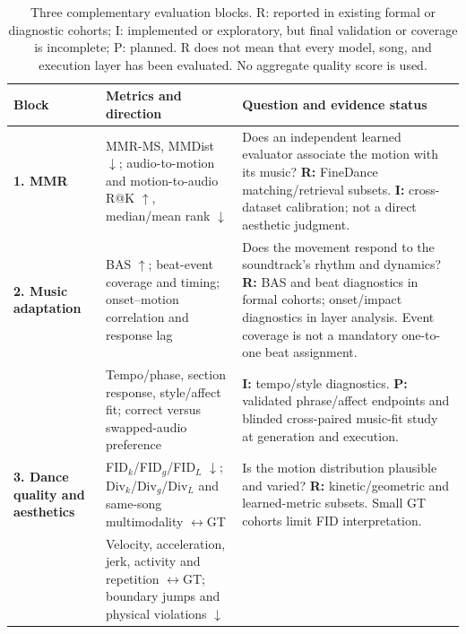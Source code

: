 \begin{table}[!t]
\centering
\caption{Three complementary evaluation blocks. R: reported in existing formal
or diagnostic cohorts; I: implemented or exploratory, but final validation or
coverage is incomplete; P: planned. R does not mean that every model, song, and
execution layer has been evaluated. No aggregate quality score is used.}
\label{tab:evaluation_matrix}
\small
\renewcommand{\arraystretch}{1.16}
\setlength{\tabcolsep}{0pt}
\begin{tabular}{@{}>{\raggedright\arraybackslash}p{}
                    @{\hspace{0.02\textwidth}}
                    >{\raggedright\arraybackslash}p{}
                    @{\hspace{0.02\textwidth}}
                    >{\raggedright\arraybackslash}p{}@{}}
\toprule
\textbf{Block} & \textbf{Metrics and direction} & \textbf{Question and evidence status} \\
\midrule
\textbf{1. MMR} & MMR-MS, MMDist $\downarrow$; audio-to-motion and motion-to-audio R@K $\uparrow$, median/mean rank $\downarrow$ &
Does an independent learned evaluator associate the motion with its music?
\textbf{R:} FineDance matching/retrieval subsets. \textbf{I:} cross-dataset calibration;
not a direct aesthetic judgment. \\
\midrule
\textbf{2. Music adaptation} & BAS $\uparrow$; beat-event coverage and timing; onset--motion correlation and response lag &
Does the movement respond to the soundtrack's rhythm and dynamics?
\textbf{R:} BAS and beat diagnostics in formal cohorts; onset/impact diagnostics in
layer analysis. Event coverage is not a mandatory one-to-one beat assignment. \\
& Tempo/phase, section response, style/affect fit; correct versus swapped-audio preference &
\textbf{I:} tempo/style diagnostics. \textbf{P:} validated phrase/affect endpoints
and blinded cross-paired music-fit study at generation and execution. \\
\midrule
\textbf{3. Dance quality and aesthetics} & FID$_k$/FID$_g$/FID$_L$ $\downarrow$;
Div$_k$/Div$_g$/Div$_L$ and same-song multimodality $\leftrightarrow$GT &
Is the motion distribution plausible and varied? \textbf{R:} kinetic/geometric
and learned-metric subsets. Small GT cohorts limit FID interpretation. \\
& Velocity, acceleration, jerk, activity and repetition $\leftrightarrow$GT;
boundary jumps and physical violations $\downarrow$ &

\end{tabular}
\end{table}
